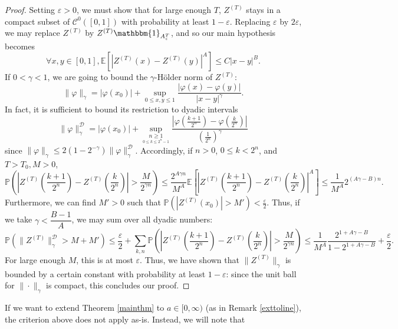 \documentclass{article}
\newcommand{\phe}{\varphi}
\newcommand{\Proba}{\mathbb{P}}
\newcommand{\1}{\mathds{1}}
\numberwithin{equation}{section}
\newcommand{\eps}{\varepsilon}
\renewcommand{\leq}{\leqslant}
\renewcommand{\geq}{\geqslant}
\newcommand{\E}{\mathbb{E}}
\theoremstyle{plain} %
\begin{document}
\begin{proof}
     Setting $\eps > 0$, we must show that for large enough $T$, $Z^{(T)}$ stays in a compact subset of $\mathcal{C}^0([0, 1])$ with probability at least $1 - \eps$. Replacing $\eps$ by $2 \eps$, we may replace $Z^{(T)}$ by $Z^{(T)}\mathbbm{1}_{A_\eps^T}$, and so our main hypothesis becomes
\begin{equation}
    \forall x, y \in [0, 1], \E[|Z^{(T)}(x)-Z^{(T)}(y)|^A ] \leq C|x-y|^B.
\end{equation}
If $0 < \gamma < 1$, we are going to bound the $\gamma$-Hölder norm of $Z^{(T)}$:
\begin{equation}
    \| \phe \|_\gamma = |\phe(x_0)| + \sup_{0 \leq x, y \leq 1} \frac{|\phe(x) - \phe(y)|}{|x-y|^\gamma}.
\end{equation}
In fact, it is sufficient to bound its restriction to dyadic intervals
\begin{equation}
    \| \phe \|_\gamma^\mathcal{D} = |\phe(x_0)| + \sup_{\underset{0 \leq k \leq 2^n - 1}{n \geq 1}} \frac{|\phe(\frac{k+1}{2^n}) - \phe(\frac{k}{2^n})|}{(\frac{1}{2^n})^\gamma}
\end{equation}
since $\| \phe \|_\gamma \leq 2(1-2^{-\gamma}) \| \phe \|_\gamma^\mathcal{D} $.
Accordingly, if $n > 0$, $0 \leq k < 2^n$, and $T > T_0, M > 0$,
\begin{equation}
            \Proba(|Z^{(T)}(\frac{k+1}{2^n}) - Z^{(T)}(\frac{k}{2^n})| > \frac{M}{2^{\gamma n}})  \leq \frac{2^{A \gamma n}}{M^A} \E[|Z^{(T)}(\frac{k+1}{2^n}) - Z^{(T)}(\frac{k}{2^n})|^A]
            \leq \frac{1}{M^A} 2^{(A \gamma - B)n}.
\end{equation}
Furthermore, we can find $M' > 0$ such that $\Proba(|Z^{(T)}(x_0)| > M') < \frac{\eps}{2}$. Thus, if we take $\gamma < \dfrac{B - 1}{A}$, we may sum over all dyadic numbers:
\begin{equation}
            \Proba(\| Z^{(T)} \|_\gamma^{\mathcal{D}} > M + M') \leq \dfrac{\eps}{2} + \sum_{k, n} \Proba(|Z^{(T)}(\frac{k+1}{2^n}) - Z^{(T)}(\frac{k}{2^n})| > \frac{M}{2^{\gamma n}}) 
             \leq \frac{1}{M^A} \frac{2^{1 + A \gamma - B}}{1 - 2^{1 + A \gamma - B}} + \dfrac{\eps}{2}.
\end{equation}
For large enough $M$, this is at most $\eps$. Thus, we have shown that $\|Z^{(T)}\|_\gamma$ is bounded by a certain constant with probability at least $1 - \eps$: since the unit ball for $\|\cdot \|_{\gamma}$ is compact, this concludes our proof.
\end{proof}
If we want to extend Theorem \ref{mainthm} to $a \in [0, \infty)$ (as in Remark \ref{exttoline}), the criterion above does not apply as-is. Instead, we will note that 
\end{document}

